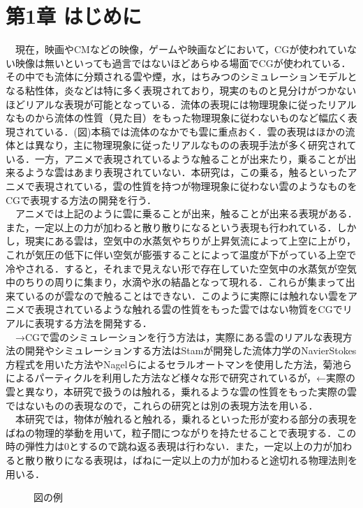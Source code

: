 \documentclass[11pt]{jreport}
\begin{document}
\chapter{第1章 はじめに}
　現在，映画やCMなどの映像，ゲームや映画などにおいて，CGが使われていない映像は無いといっても過言ではないほどあらゆる場面でCGが使われている．その中でも流体に分類される雲や煙，水，はちみつのシミュレーションモデルとなる粘性体，炎などは特に多く表現されており，現実のものと見分けがつかないほどリアルな表現が可能となっている．流体の表現には物理現象に従ったリアルなものから流体の性質（見た目）をもった物理現象に従わないものなど幅広く表現されている．(図)本稿では流体のなかでも雲に重点おく．雲の表現はほかの流体とは異なり，主に物理現象に従ったリアルなものの表現手法が多く研究されている．一方，アニメで表現されているような触ることが出来たり，乗ることが出来るような雲はあまり表現されていない．本研究は，この乗る，触るといったアニメで表現されている，雲の性質を持つが物理現象に従わない雲のようなものをCGで表現する方法の開発を行う．\\
　アニメでは上記のように雲に乗ることが出来，触ることが出来る表現がある．また，一定以上の力が加わると散り散りになるという表現も行われている．しかし，現実にある雲は，空気中の水蒸気やちりが上昇気流によって上空に上がり，これが気圧の低下に伴い空気が膨張することによって温度が下がっている上空で冷やされる．すると，それまで見えない形で存在していた空気中の水蒸気が空気中のちりの周りに集まり，水滴や氷の結晶となって現れる．これらが集まって出来ているのが雲なので触ることはできない．このように実際には触れない雲をアニメで表現されているような触れる雲の性質をもった雲ではない物質をCGでリアルに表現する方法を開発する．\\
　→CGで雲のシミュレーションを行う方法は，実際にある雲のリアルな表現方法の開発やシミュレーションする方法はStamが開発した流体力学のNavierStokes方程式を用いた方法やNagelらによるセラルオートマンを使用した方法，菊池らによるパーティクルを利用した方法など様々な形で研究されているが，←実際の雲と異なり，本研究で扱うのは触れる，乗れるような雲の性質をもった実際の雲ではないものの表現なので，これらの研究とは別の表現方法を用いる．\\
　本研究では，物体が触れると触れる，乗れるといった形が変わる部分の表現をばねの物理的挙動を用いて，粒子間につながりを持たせることで表現する．この時の弾性力は0とするので跳ね返る表現は行わない．また，一定以上の力が加わると散り散りになる表現は，ばねに一定以上の力が加わると途切れる物理法則を用いる．\\

\begin{figure}
  \begin{center}

  \end{center}
  \caption{図の例}
  \label{fig:sample}
\end{figure}
\end{document}
